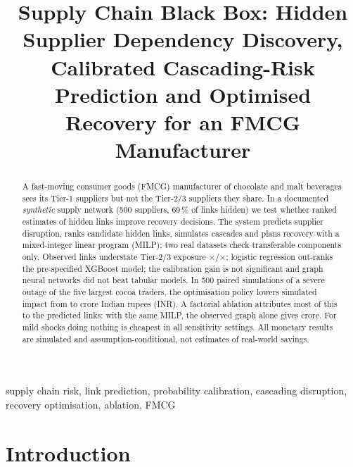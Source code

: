 \documentclass[conference]{IEEEtran}
\begin{document}
\title{Supply Chain Black Box: Hidden Supplier Dependency Discovery, Calibrated Cascading-Risk Prediction and Optimised Recovery for an FMCG Manufacturer}

\author{
}

\maketitle

\begin{abstract}
A fast-moving consumer goods (FMCG) manufacturer of chocolate and malt beverages sees its Tier-1 suppliers but not the Tier-2/3 suppliers they share. In a documented
\emph{synthetic} supply network (500 suppliers, 69\,\% of links hidden) we test whether ranked estimates of hidden links improve recovery
decisions. The system predicts supplier disruption, ranks candidate hidden links, simulates cascades and plans recovery with a mixed-integer linear
program (MILP); two real datasets check transferable components only. Observed links
understate Tier-2/3 exposure \GapTwo$\times$/\GapThree$\times$; logistic regression out-ranks the pre-specified XGBoost model; the calibration gain is not significant and
graph neural networks did not beat tabular models. In 500 paired simulations of a severe outage of the five largest cocoa traders, the
optimisation policy lowers simulated impact from \SevA{} to \SevC{} crore Indian rupees (INR). A factorial ablation attributes most of this to the predicted
links: with the same MILP, the observed graph alone gives \AblCobs{} crore. For mild shocks doing nothing is cheapest in all \SensN{} sensitivity
settings. All monetary results are simulated and assumption-conditional, not estimates of real-world savings.
\end{abstract}

\begin{IEEEkeywords}
supply chain risk, link prediction, probability calibration, cascading disruption, recovery optimisation, ablation, FMCG
\end{IEEEkeywords}

\section{Introduction}
\end{document}
